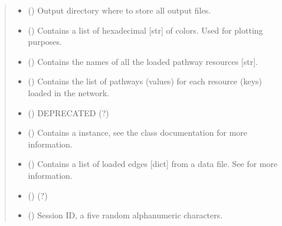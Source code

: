 \documentclass[letterpaper,10pt,english]{sphinxmanual}
\begin{document}
\begin{fulllineitems}
\begin{quote}
\begin{description}
\begin{itemize}
\item {} 
 () \textendash{} Output directory where to store all output files.

\item {} 
 () \textendash{} Contains a list of hexadecimal {[}str{]} of colors. Used for
plotting purposes.

\item {} 
 () \textendash{} Contains the names of all the loaded pathway resources {[}str{]}.

\item {} 
 () \textendash{} Contains the list of pathways (values) for each resource (keys)
loaded in the network.

\item {} 
 () \textendash{} DEPRECATED (?)

\item {} 
 () \textendash{} Contains a 
instance, see the class documentation for more information.

\item {} 
 () \textendash{} Contains a list of loaded edges {[}dict{]} from a data file. See
{\hyperref[\detokenize{reference:pypath.main.PyPath.read_data_file}]{}} for more information.

\item {} 
 () \textendash{} (?)

\item {} 
 () \textendash{} Session ID, a five random alphanumeric characters.


\end{itemize}
\end{description}
\end{quote}
\end{fulllineitems}
\end{document}
